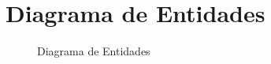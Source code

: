%
%
%
\chapter{Diagrama de Entidades} \label{ap:a}

\begin{figure}[h]
	\begin{center}
	\end{center}
	\caption{Diagrama de Entidades}\label{fig:}
\end{figure}